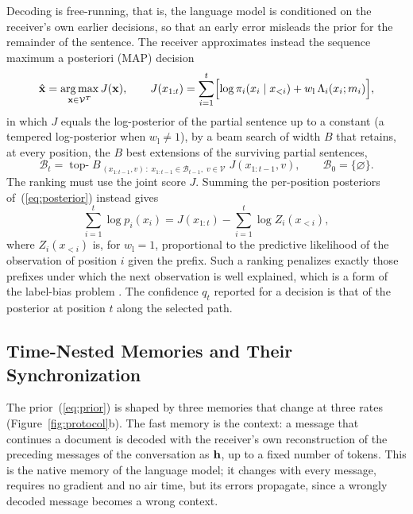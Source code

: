 Decoding is free-running, that is, the language model is conditioned on the receiver's own earlier decisions, so that an early error misleads the prior for the remainder of the sentence. The receiver approximates instead the sequence maximum a posteriori (MAP) decision
\begin{equation}
\hat{\mathbf{x}} = \operatorname*{arg\,max}_{\mathbf{x}\in\mathcal{V}^T} J(\mathbf{x}),\qquad
J(x_{1:t}) = \sum_{i=1}^{t}\Bigl[\log\pi_i(x_i\mid x_{<i}) + w_\mathrm{l}\,\Lambda_i(x_i;m_i)\Bigr],
\label{eq:map}
\end{equation}
in which $J$ equals the log-posterior of the partial sentence up to a constant (a tempered log-posterior when $w_\mathrm{l}\neq 1$), by a beam search of width $B$ that retains, at every position, the $B$ best extensions of the surviving partial sentences,
\begin{equation}
\mathcal{B}_t = \operatorname*{top-}B_{\,(x_{1:t-1},v)\,:\;x_{1:t-1}\in\mathcal{B}_{t-1},\;v\in\mathcal{V}}\; J(x_{1:t-1},v),\qquad \mathcal{B}_0 = \{\varnothing\}.
\label{eq:beam}
\end{equation}
The ranking must use the joint score $J$. Summing the per-position posteriors of~(\ref{eq:posterior}) instead gives
\begin{equation}
\sum_{i=1}^{t}\log p_i(x_i) = J(x_{1:t}) - \sum_{i=1}^{t}\log Z_i(x_{<i}),
\label{eq:labelbias}
\end{equation}
where $Z_i(x_{<i})$ is, for $w_\mathrm{l} = 1$, proportional to the predictive likelihood of the observation of position $i$ given the prefix. Such a ranking penalizes exactly those prefixes under which the next observation is well explained, which is a form of the label-bias problem \cite{lafferty2001}. The confidence $q_t$ reported for a decision is that of the posterior at position $t$ along the selected path.

\subsection{Time-Nested Memories and Their Synchronization}
\label{sec:method-memories}

The prior~(\ref{eq:prior}) is shaped by three memories that change at three rates (Figure~\ref{fig:protocol}b). The fast memory is the context: a message that continues a document is decoded with the receiver's own reconstruction of the preceding messages of the conversation as $\mathbf{h}$, up to a fixed number of tokens. This is the native memory of the language model; it changes with every message, requires no gradient and no air time, but its errors propagate, since a wrongly decoded message becomes a wrong context.


